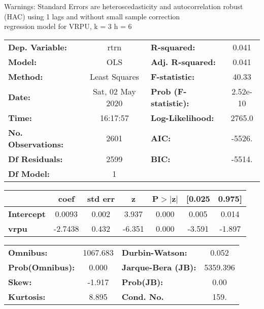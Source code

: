 Warnings: \newline
 [1] Standard Errors are heteroscedasticity and autocorrelation robust (HAC) using 1 lags and without small sample correction\\ 

regression model for VRPU, k = 3 h = 6\begin{center}
\begin{tabular}{lclc}
\toprule
\textbf{Dep. Variable:}    &       rtrn       & \textbf{  R-squared:         } &     0.041   \\
\textbf{Model:}            &       OLS        & \textbf{  Adj. R-squared:    } &     0.041   \\
\textbf{Method:}           &  Least Squares   & \textbf{  F-statistic:       } &     40.33   \\
\textbf{Date:}             & Sat, 02 May 2020 & \textbf{  Prob (F-statistic):} &  2.52e-10   \\
\textbf{Time:}             &     16:17:57     & \textbf{  Log-Likelihood:    } &    2765.0   \\
\textbf{No. Observations:} &        2601      & \textbf{  AIC:               } &    -5526.   \\
\textbf{Df Residuals:}     &        2599      & \textbf{  BIC:               } &    -5514.   \\
\textbf{Df Model:}         &           1      & \textbf{                     } &             \\
\bottomrule
\end{tabular}
\begin{tabular}{lcccccc}
                   & \textbf{coef} & \textbf{std err} & \textbf{z} & \textbf{P$> |$z$|$} & \textbf{[0.025} & \textbf{0.975]}  \\
\midrule
\textbf{Intercept} &       0.0093  &        0.002     &     3.937  &         0.000        &        0.005    &        0.014     \\
\textbf{vrpu}      &      -2.7438  &        0.432     &    -6.351  &         0.000        &       -3.591    &       -1.897     \\
\bottomrule
\end{tabular}
\begin{tabular}{lclc}
\textbf{Omnibus:}       & 1067.683 & \textbf{  Durbin-Watson:     } &    0.052  \\
\textbf{Prob(Omnibus):} &   0.000  & \textbf{  Jarque-Bera (JB):  } & 5359.396  \\
\textbf{Skew:}          &  -1.917  & \textbf{  Prob(JB):          } &     0.00  \\
\textbf{Kurtosis:}      &   8.895  & \textbf{  Cond. No.          } &     159.  \\
\bottomrule
\end{tabular}
\end{center}

